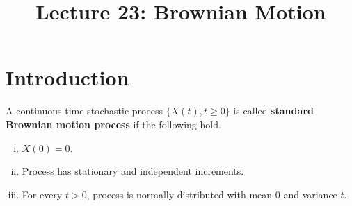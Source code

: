 \documentclass[a4paper,10pt,english]{article}
\title{Lecture 23: Brownian Motion}
\author{}
\begin{document}
\maketitle
\section{Introduction}
\begin{defn} A continuous time stochastic process $\{X(t), t \geqslant 0\}$ is called \textbf{standard Brownian motion process} if the following hold.
\begin{enumerate}[i)]
\item $X(0) = 0$.
\item Process has stationary and independent increments.
\item For every $t > 0$, process is normally distributed with mean $0$ and variance $t$.
\end{enumerate}
\end{defn}
\end{document}

